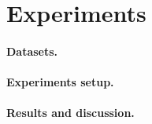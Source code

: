 \section{Experiments}

\paragraph{Datasets.}

\paragraph{Experiments setup.}

\paragraph{Results and discussion.}
